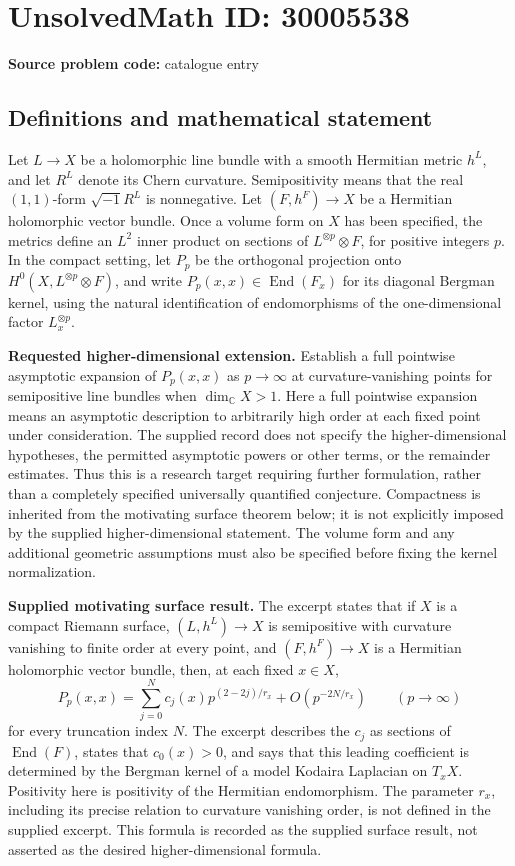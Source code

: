 \documentclass[11pt]{article}
\newcommand{\C}{\mathbb{C}}
\begin{document}
\section*{UnsolvedMath ID: 30005538}
\textbf{Source problem code:} catalogue entry
\subsection{Definitions and mathematical statement}
Let \(L\to X\) be a holomorphic line bundle with a smooth Hermitian metric \(h^L\), and let \(R^L\) denote its Chern curvature. Semipositivity means that the real \((1,1)\)-form \(\sqrt{-1}R^L\) is nonnegative. Let \((F,h^F)\to X\) be a Hermitian holomorphic vector bundle. Once a volume form on \(X\) has been specified, the metrics define an \(L^2\) inner product on sections of \(L^{\otimes p}\otimes F\), for positive integers \(p\). In the compact setting, let \(P_p\) be the orthogonal projection onto \(H^0(X,L^{\otimes p}\otimes F)\), and write \(P_p(x,x)\in\operatorname{End}(F_x)\) for its diagonal Bergman kernel, using the natural identification of endomorphisms of the one-dimensional factor \(L_x^{\otimes p}\).

\textbf{Requested higher-dimensional extension.} Establish a full pointwise asymptotic expansion of \(P_p(x,x)\) as \(p\to\infty\) at curvature-vanishing points for semipositive line bundles when \(\dim_{\C}X>1\). Here a full pointwise expansion means an asymptotic description to arbitrarily high order at each fixed point under consideration. The supplied record does not specify the higher-dimensional hypotheses, the permitted asymptotic powers or other terms, or the remainder estimates. Thus this is a research target requiring further formulation, rather than a completely specified universally quantified conjecture. Compactness is inherited from the motivating surface theorem below; it is not explicitly imposed by the supplied higher-dimensional statement. The volume form and any additional geometric assumptions must also be specified before fixing the kernel normalization.

\textbf{Supplied motivating surface result.} The excerpt states that if \(X\) is a compact Riemann surface, \((L,h^L)\to X\) is semipositive with curvature vanishing to finite order at every point, and \((F,h^F)\to X\) is a Hermitian holomorphic vector bundle, then, at each fixed \(x\in X\),
\[
P_p(x,x)=\sum_{j=0}^{N}c_j(x)p^{(2-2j)/r_x}
 +O\!\left(p^{-2N/r_x}\right)
\qquad(p\to\infty)
\]
for every truncation index \(N\). The excerpt describes the \(c_j\) as sections of \(\operatorname{End}(F)\), states that \(c_0(x)>0\), and says that this leading coefficient is determined by the Bergman kernel of a model Kodaira Laplacian on \(T_xX\). Positivity here is positivity of the Hermitian endomorphism. The parameter \(r_x\), including its precise relation to curvature vanishing order, is not defined in the supplied excerpt. This formula is recorded as the supplied surface result, not asserted as the desired higher-dimensional formula.
\end{document}
